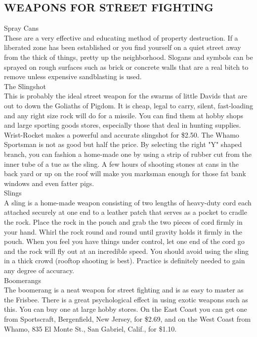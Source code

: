 \documentclass[11pt,twoside,a4paper]{book}
\begin{document}
\subsection{WEAPONS FOR STREET FIGHTING}

\clearpage

Spray Cans~\\
These are a very effective and educating method of property destruction. If a liberated zone has been established or you find yourself on a quiet street away from the thick of things, pretty up the neighborhood. Slogans and symbols can be sprayed on rough surfaces such as brick or concrete walls that are a real bitch to remove unless expensive sandblasting is used. ~\\

The Slingshot~\\
This is probably the ideal street weapon for the swarms of little Davids that are out to down the Goliaths of Pigdom. It is cheap, legal to carry, silent, fast-loading and any right size rock will do for a missile. You can find them at hobby shops and large sporting goods stores, especially those that deal in hunting supplies. Wrist-Rocket makes a powerful and accurate slingshot for \$2.50. The Whamo Sportsman is not as good but half the price. By selecting the right "Y" shaped branch, you can fashion a home-made one by using a strip of rubber cut from the inner tube of a tue as the sling. A few hours of shooting stones at cans in the back yard or up on the roof will make you marksman enough for those fat bank windows and even fatter pigs.~\\

Slings~\\
A sling is a home-made weapon consisting of two lengths of heavy-duty cord each attached securely at one end to a leather patch that serves as a pocket to cradle the rock. Place the rock in the pouch and grab the two pieces of cord firmly in your hand. Whirl the rock round and round until gravity holds it firmly in the pouch. When you feel you have things under control, let one end of the cord go and the rock will fly out at an incredible speed. You should avoid using the sling in a thick crowd (rooftop shooting is best). Practice is definitely needed to gain any degree of accuracy.~\\

Boomerangs~\\
The boomerang is a neat weapon for street fighting and is as easy to master as the Frisbee. There is a great psychological effect in using exotic weapons such as this. You can buy one at large hobby stores. On the East Coast you can get one from Sportscraft, Bergenfield, New Jersey, for \$2.69, and on the West Coast from Whamo, 835 El Monte St., San Gabriel, Calif., for \$1.10.~\\
\end{document}
